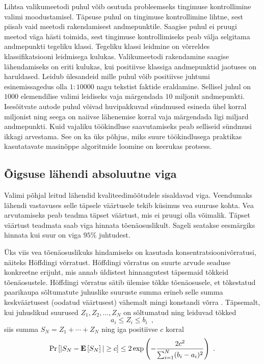 Lihtsa valikumeetodi puhul võib osutuda probleemseks tingimuse kontrollimine valimi moodustamisel. Täpsuse puhul on tingimuse kontrollimine lihtne, sest piisab vaid meetodi rakendamisest andmepunktile. Saagise puhul ei pruugi meetod väga hästi toimida, sest tingimuse kontrollimiseks peab välja selgitama andmepunkti tegeliku klassi. Tegeliku klassi leidmine on võrreldes klassifikatsiooni leidmisega kulukas. Valikumeetodi rakendamine saagise lähendamiseks on eriti kulukas, kui positiivse klassiga andmepunktid jaotuses on haruldased. Leidub ülesandeid mille puhul võib positiivse juhtumi esinemissagedus olla $1:10 000$ nagu tekstist faktide eraldamine. Sellisel juhul on $1 000$ elemendilise valimi leidiseks vaja märgendada $10$ miljonit andmepunkti. Isesõitvate autode puhul võivad huvipakkuvad sündmused esineda ühel korral miljonist ning seega on naiivse lähenemise korral vaja märgendada ligi miljard andmepunkti. Kuid vajaliku töökindluse saavutamiseks peab selliseid sündmusi ikkagi arvestama. See on ka üks põhjus, miks suure töökindlusega praktikas kasutatavate masinõppe algoritmide loomine on keerukas protsess.

\subsection{Õigsuse lähendi absoluutne viga}
Valimi põhjal leitud lähendid kvaliteedimõõtudele sisaldavad viga. Veendumaks lähendi vastavuses selle täpsele väärtusele tekib küsimus vea suuruse kohta. Vea arvutamiseks peab teadma täpset väärtust, mis ei pruugi olla võimalik. Täpset väärtust teadmata saab viga hinnata tõenäosuslikult. Sageli seatakse eesmärgiks hinnata kui suur on viga $95\%$ juhtudest.

Üks viis vea tõenäosuslikuks hindamiseks on kasutada konsentratsioonivõrratusi, näiteks Höffdingi võrratust. Höffdingi võrratus on suurte arvude seaduse konkreetne erijuht, mis annab üldistest hinnangutest täpsemaid tõkkeid tõenäosustele. Höffdingi võrratus sätib ülemise tõkke tõenäosusele, et tõkestatud paarikaupa sõltumatute juhuslike suuruste summa erineb selle summa keskväärtusest (oodatud väärtusest) vähemalt mingi konstandi võrra \cite{höffdingi-võrratus,tõenäosusteooria-2-loengukonspekt}. Täpsemalt, kui juhuslikud suurused $Z_1,Z_2,\dots,Z_N$ on sõltumatud ning leiduvad tõkked
\begin{equation*}
    a_i\leq Z_i\leq b_i \enspace, 
\end{equation*}
siis summa $S_N=Z_1+\cdots+Z_N$ ning iga positiivse $c$ korral
\begin{equation*}
    \Pr\left[| S_N - \operatorname*{\mathbf{E}}\left[S_N\right] | \geq c\right] \leq 2 \exp{\left( - \frac{2 c^2}{\sum_{i = 1}^{N}(b_i - a_i)^2}\right)} \enspace .
\end{equation*}

